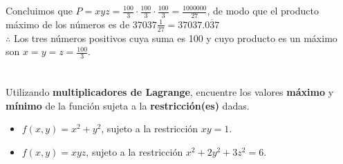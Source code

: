 \documentclass[12pt]{article}
\begin{document}
Concluimos que  $P=xyz=\frac{100}{3} \cdot \frac{100}{3} \cdot \frac{100}{3} = \frac{1000000}{27}$, de modo que el producto máximo de los números es de $37037\frac{1}{27} = 37037.\overline{037}$\\

$\therefore $ Los tres números positivos cuya suma es 100 y cuyo producto es un máximo son $x=y=z=\frac{100}{3}$.

\section{}

Utilizando \textbf{multiplicadores de Lagrange}, encuentre los valores \textbf{máximo} y \textbf{mínimo} de la función sujeta a la \textbf{restricción(es)} dadas.

\begin{itemize}[format=\textbf]

\item $f(x, y) = x^2 + y^2$, sujeto a la restricción $xy = 1$.

\item $f(x, y) = xyz$, sujeto a la restricción $x^2 + 2y^2 + 3z^2 = 6$.
  
\end{itemize}
\end{document}

